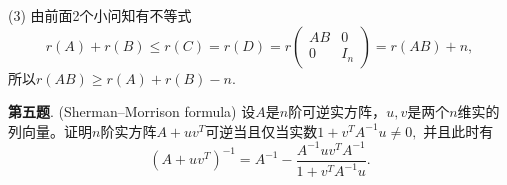 (3) 由前面2个小问知有不等式
$$r(A) + r(B) \leqslant r(C) = r(D) = r \begin{pmatrix} AB & 0 \\ 0 & I_n \end{pmatrix} = r(AB) + n,$$
所以$r(AB) \geqslant r(A) + r(B) - n.$

\fi  %

\newpageorvspace

{\bf 第五题}. (Sherman–Morrison formula) 设$A$是$n$阶可逆实方阵，$u, v$是两个$n$维实的列向量。证明$n$阶实方阵$A + uv^T$可逆当且仅当实数$1 + v^TA^{-1}u \neq 0,$ 并且此时有
$$ \left(A + uv^T \right)^{-1} = A^{-1} - \dfrac{ A^{-1}uv^TA^{-1}}{1 + v^TA^{-1}u}.$$

\ifIncludeAnswer

\newpageorvspace

